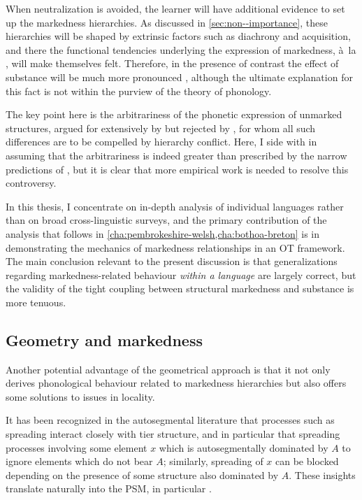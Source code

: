 When neutralization is avoided, the learner will have additional evidence to set up the markedness hierarchies. As discussed in \cref{sec:non--importance}, these hierarchies will be shaped by extrinsic factors such as diachrony and acquisition, and there the functional tendencies underlying the expression of markedness, à~la \citet{steriade94:_posit,steriade97:_phonet,steriade01}, will make themselves felt. Therefore, in the presence of contrast the effect of substance will be much more pronounced \citep{rice09:_nuanc}, although the ultimate explanation for this fact is not within the purview of the theory of phonology.

The key point here is the arbitrariness of the phonetic expression of unmarked structures, argued for extensively by \citet{rice03:_featur,rice07:_marked,rice09:_nuanc,rice11:_what} but rejected by \citet{delacy2006}, for whom all such differences are to be compelled by hierarchy conflict. Here, I side with \citet{rice11:_what} in assuming that the arbitrariness is indeed greater than prescribed by the narrow predictions of \citet{delacy2006}, but it is clear that more empirical work is needed to resolve this controversy.

In this thesis, I concentrate on in\hyp depth analysis of individual languages rather than on broad cross\hyp linguistic surveys, and the primary contribution of the analysis that follows in \cref{cha:pembrokeshire-welsh,cha:bothoa-breton} is in demonstrating the mechanics of markedness relationships in an OT framework. The main conclusion relevant to the present discussion is that  generalizations regarding markedness\hyp related behaviour \emph{within a language} are largely correct, but the validity of the tight coupling between structural markedness and substance is more tenuous.

\subsection{Geometry and markedness}
\label{sec:geometry-markedness}

Another potential advantage of the geometrical approach is that it not only derives phonological behaviour related to markedness hierarchies but also offers some solutions to issues in locality.

It has been recognized in the autosegmental literature \citep[\egm][]{avery-rice,piggott92:_variab_featur_depen,odden94:_adjac} that processes such as spreading interact closely with tier structure, and in particular that spreading processes involving some element $x$ which is autosegmentally dominated by $A$ to ignore elements which do not bear $A$; similarly, spreading of $x$ can be blocked depending on the presence of some structure also dominated by $A$. These insights translate naturally into the PSM, \cf in particular \citet{youssef10:_laryn_buchan_scots}.

